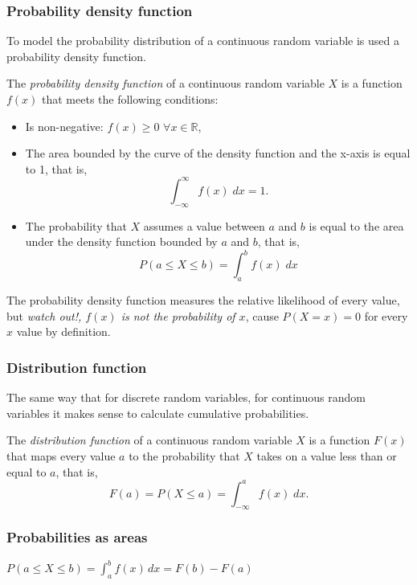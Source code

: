 \begin{frame}
\frametitle{Probability density function}
To model the probability distribution of a continuous random variable is used a probability density function.

\begin{definition}
The \emph{probability density function} of a continuous random variable $X$ is a function $f(x)$ that meets the
following conditions:
\begin {itemize}
\item Is non-negative: $f(x)\geq 0$ $\forall x\in \mathbb{R}$,
\item The area bounded by the curve of the density function and the x-axis is equal to 1, that is,
\[
\int_{-\infty}^{\infty} f(x)\; dx = 1.
\]
\item The probability that $X$ assumes a value between $a$ and $b$ is equal to the area under the density function
bounded by $a$ and $b$, that is,
\[
P(a\leq X\leq b) = \int_a^b f(x)\; dx
\]
\end{itemize}
\end{definition}

The probability density function measures the relative likelihood of every value, but \alert{\emph{watch out!, $f(x)$ is
not the probability of $x$}}, cause $P(X=x)=0$ for every $x$ value by definition.
\end{frame}


\begin{frame}
\frametitle{Distribution function}
The same way that for discrete random variables, for continuous random variables it makes sense to calculate cumulative
probabilities.
\begin{definition}
The \emph{distribution function} of a continuous random variable $X$ is a function $F(x)$ that maps every value $a$ to
the probability that $X$ takes on a value less than or equal to $a$, that is,
\[
F(a) = P(X\leq a) = \int_{-\infty}^{a} f(x)\; dx.
\]
\end{definition}

\end{frame}


\begin{frame}
\frametitle{Probabilities as areas}

\begin{center}
$\displaystyle P(a\leq X\leq b) = \int_a^b f(x)\, dx = F(b)-F(a)$
\end{center}
\end{frame}



